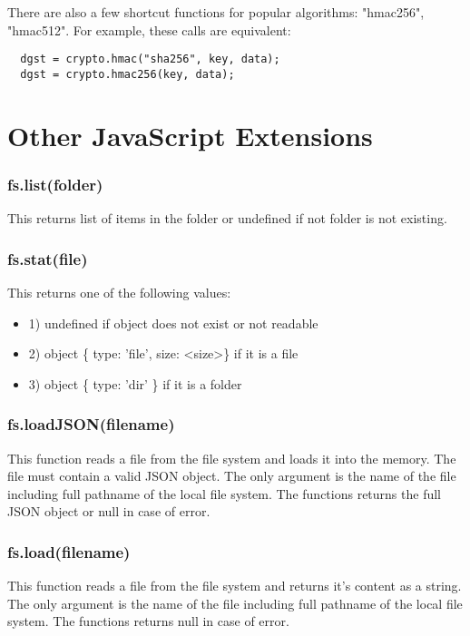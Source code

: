 There are also a few shortcut functions for popular algorithms: "hmac256", "hmac512". For example, these calls are equivalent:

\begin{lstlisting}
  dgst = crypto.hmac("sha256", key, data);
  dgst = crypto.hmac256(key, data);
\end{lstlisting}

\section{Other JavaScript Extensions}

\subsubsection{fs.list(folder)}

This returns list of items in the folder or undefined if not folder is not existing.


\subsubsection{fs.stat(file)}

This returns one of the following values:

\begin{itemize}
\item 1) undefined if object does not exist or not readable
\item 2) object \{ type: 'file', size: \textless{}size\textgreater{}\} if it is a file
\item 3) object \{ type: 'dir' \} if it is a folder
\end{itemize} 


\subsubsection{fs.loadJSON(filename)}

This function reads a file from the file system and loads it into the memory. The file must contain a valid JSON object. The only argument is the name of the file including full pathname of the local file system. The functions returns the full JSON object or null in case of error.

\subsubsection{fs.load(filename)}

This function reads a file from the file system and returns it's content as a string. The only argument is the name of the file including full pathname of the local file system. The functions returns null in case of error.

